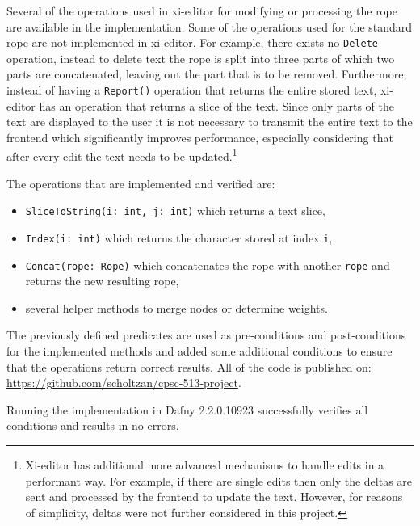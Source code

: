 Several of the operations used in xi-editor for modifying or processing the rope are available in the implementation.
Some of the operations used for the standard rope are not implemented in xi-editor.
For example, there exists no \texttt{Delete} operation, instead to delete text the rope is split into three parts of which two parts are concatenated, leaving out the part that is to be removed.
Furthermore, instead of having a \texttt{Report()} operation that returns the entire stored text, xi-editor has an operation that returns a slice of the text.
Since only parts of the text are displayed to the user it is not necessary to transmit the entire text to the frontend which significantly improves performance, especially considering that after every edit the text needs to be updated.\footnote{Xi-editor has additional more advanced mechanisms to handle edits in a performant way. For example, if there are single edits then only the deltas are sent and processed by the frontend to update the text. However, for reasons of simplicity, deltas were not further considered in this project.}

The operations that are implemented and verified are:
\begin{itemize}
  \item \texttt{SliceToString(i: int, j: int)} which returns a text slice,
  \item \texttt{Index(i: int)} which returns the character stored at index \texttt{i},
  \item \texttt{Concat(rope: Rope)} which concatenates the rope with another \texttt{rope} and returns the new resulting rope,
  \item several helper methods to merge nodes or determine weights.
\end{itemize}


The previously defined predicates are used as pre-conditions and post-conditions for the implemented methods and added some additional conditions to ensure that the operations return correct results.
All of the code is published on: \url{https://github.com/scholtzan/cpsc-513-project}.

Running the implementation in Dafny 2.2.0.10923 successfully verifies all conditions and results in no errors.
